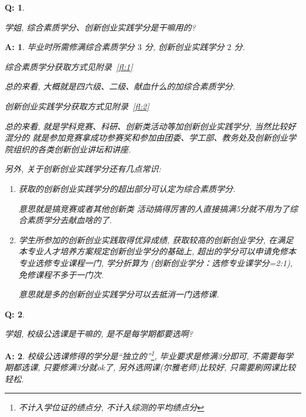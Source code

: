 \documentclass[UTF8]{ctexart}
\theoremstyle{nonumberplain}
\newtheorem{Q}{Q:}
\theoremstyle{nonumberplain}
\newtheorem{A}{A:}
\newcommand{\FAQ}[2]{
    \begin{Q}
        #1
    \end{Q}
    \begin{A}
        #2
    \end{A}
}
\begin{document}
    \FAQ{\hypertarget{3}{学姐, 综合素质学分、创新创业实践学分是干嘛用的?}}{
        毕业时所需修满综合素质学分 $3$ 分, 创新创业实践学分 $2$ 分.

        综合素质学分获取方式见附录~\ref{fl:1}
        
        总的来看, 大概就是四六级、二级、献血什么的加综合素质学分.

        创新创业实践学分获取方式见附录~\ref{fl:2}
        
        总的来看, 就是学科竞赛、科研、创新类活动等加创新创业实践学分, 当然比较好混分的
        就是参加竞赛拿成功参赛奖和参加由团委、学工部、教务处及创新创业学院组织的各类创新创业讲坛和讲座. 

        另外, 关于创新创业实践学分还有几点常识:
        \begin{enumerate}
            \item 获取的创新创业实践学分的超出部分可认定为综合素质学分. 
            
            意思就是搞竞赛或者其他创新类
            活动搞得厉害的人直接搞满5分就不用为了综合素质学分去献血啥的了.
            \item 学生所参加的创新创业实践取得优异成绩, 获取较高的创新创业学分, 在满足本专业人才培养方案规定创新创业学分的基础上, 超出的学分可以申请免修本专业选修专业课程一门, 学分折算为
            (创新创业学分：选修专业课学分=2:1), 免修课程不多于一门次. 
            
            意思就是多的创新创业实践学分可以去抵消一门选修课.
        \end{enumerate}
    }

    \FAQ{\hypertarget{4}{学姐, 校级公选课是干嘛的, 是不是每学期都要选啊?}}{
        校级公选课修得的学分是“独立的”\footnote{不计入学位证的绩点分, 不计入综测的平均绩点分}, 毕业要求是修满3分即可, 不需要每学期都选课, 只要修满3分就ok了, 另外选网课(尔雅老师)比较好, 只需要刷网课比较轻松.
    }
\end{document}
